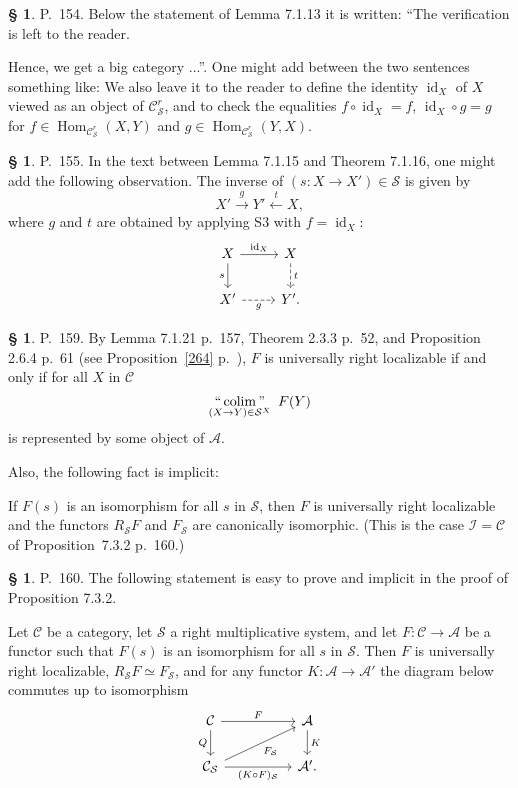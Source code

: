 \documentclass[12pt]{article}
\theoremstyle{remark}
\theoremstyle{definition}
\newtheorem{cm}[thm]{\S}
\newcommand{\bc}{\begin{cm}}\newcommand{\ec}{\end{cm}}
\newcommand{\cc}{\mathcal}
\newcommand{\A}{\mathcal A}
\newcommand{\C}{\mathcal C}
\newcommand{\SSS}{\mathcal S}
\newcommand{\pr}{Proposition}
\DeclareMathOperator*{\coli}{colim}
\DeclareMathOperator*{\icolim}{``\coli"}
\DeclareMathOperator{\id}{id}
\DeclareMathOperator{\Hom}{Hom}
\begin{document}
\bc P.~154. Below the statement of Lemma 7.1.13 it is written: ``The verification is left to the reader.

Hence, we get a big category ...''. One might add between the two sentences something like: We also leave it to the reader to define the identity $\id_X$ of $X$ viewed as an object of $\C^r_{\mathcal S}$, and to check the equalities $f\circ\id_X=f$, $\id_X\circ g=g$ for $f\in\Hom_{\C^r_{\mathcal S}}(X,Y)$ and $g\in\Hom_{\C^r_{\mathcal S}}(Y,X)$.
\ec 


\bc P.~155. In the text between Lemma 7.1.15 and Theorem 7.1.16, one might add the following observation. The inverse of $(s:X\to X')\in\mathcal S$ is given by 
$$
X'\overset{g}{\to}Y'\overset{t}{\leftarrow}X,
$$
where $g$ and $t$ are obtained by applying S3 with $f=\id_X$:
$$
\begin{tikzcd}
X\ar{r}{\id_X}\ar{d}[swap]{s}&X\ar[dashed]{d}{t}\\ X'\ar[dashed]{r}[swap]{g}&Y'.
\end{tikzcd}
$$
\ec 


\bc P.~159. By Lemma 7.1.21 p.~157, Theorem 2.3.3 p.~52, and Proposition 2.6.4 p.~61 (see \pr\ \ref{264} p.~\pageref{264}), $F$ is universally right localizable if and only if for all $X$ in $\C$ 
$$
\icolim_{(X\to Y)\in\SSS^X}\ F(Y) 
$$
is represented by some object of $\A$. 

Also, the following fact is implicit:

If $F(s)$ is an isomorphism for all $s$ in $\cc S$, then $F$ is universally right localizable and the functors $R_{\cc S}F$ and $F_{\cc S}$ are canonically isomorphic. (This is the case $\cc I=\C$ of \pr\ 7.3.2 p.~160.)
\ec 


\bc P.~160. The following statement is easy to prove and implicit in the proof of Proposition 7.3.2. 

Let $\C$ be a category, let $\SSS$ a right multiplicative system, and let $F:\C\to\A$ be a functor such that $F(s)$ is an isomorphism for all $s$ in $\SSS$. Then $F$ is universally right localizable, $R_{\SSS}F\simeq F_{\SSS}$, and for any functor $K:\A\to\A'$ the diagram below commutes up to isomorphism
$$
\begin{tikzcd}
\C\ar{rr}{F}\ar{d}[swap]{Q}&&\A\ar{d}{K}\\
\C_{\SSS}\ar{rr}[swap]{(K\circ F)_{\SSS}}\ar{rru}[swap]{F_{\SSS}}&&\A'.
\end{tikzcd}
$$
\ec 
\end{document}

